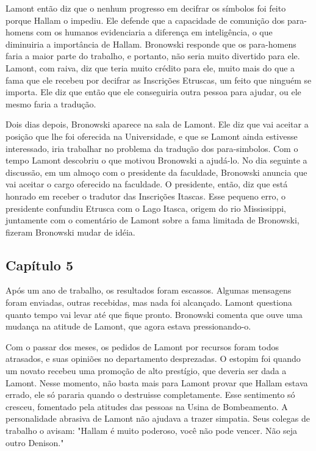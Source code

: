 \documentclass[14pt,portuguese]{extreport}
\begin{document}
        Lamont então diz que o nenhum progresso em decifrar os símbolos foi feito porque Hallam o impediu. Ele defende que a capacidade de comunição dos para-homens com os humanos evidenciaria a diferença em inteligência, o que diminuiria a importância de Hallam. Bronowski responde que os para-homens faria a maior parte do trabalho, e portanto, não seria muito divertido para ele. Lamont, com raiva, diz que teria muito crédito para ele, muito mais do que a fama que ele recebeu por decifrar as Inscrições Etruscas, um feito que ninguém se importa. Ele diz que então que ele conseguiria outra pessoa para ajudar, ou ele mesmo faria a tradução.
	
    	  Dois dias depois, Bronowski aparece na sala de Lamont. Ele diz que vai aceitar a posição que lhe foi oferecida na Universidade, e que se Lamont ainda estivesse interessado, iria trabalhar no problema da tradução dos para-simbolos. Com o tempo Lamont descobriu o que motivou Bronowski a ajudá-lo. No dia seguinte a discussão, em um almoço com o presidente da faculdade, Bronowski anuncia que vai aceitar o cargo oferecido na faculdade. O presidente, então, diz que está honrado em receber o tradutor das Inscrições Itascas. Esse pequeno erro, o presidente confundiu Etrusca com o Lago Itasca, origem do rio Mississippi, juntamente com o comentário de Lamont sobre a fama limitada de Bronowski, fizeram Bronowski mudar de idéia.

      \subsection{Capítulo 5}

    	  Após um ano de trabalho, os resultados foram escassos. Algumas mensagens foram enviadas, 
    	  outras recebidas, mas nada foi alcançado. Lamont questiona quanto tempo vai levar 
    	  até que fique pronto. Bronowski comenta que ouve uma mudança na atitude de Lamont, que agora 
    	  estava pressionando-o.
	
    	  Com o passar dos meses, os pedidos de Lamont por recursos foram todos atrasados, e suas opiniões no departamento desprezadas. O estopim foi quando um novato recebeu uma promoção de alto prestígio, que deveria ser dada a Lamont. Nesse momento, não basta mais para Lamont provar que Hallam estava errado, ele só pararia quando o destruisse completamente. Esse sentimento só cresceu, fomentado pela atitudes das pessoas na Usina de Bombeamento. A personalidade abrasiva de Lamont não ajudava a trazer simpatia. Seus colegas de trabalho o avisam: "Hallam é muito poderoso, você não pode vencer. Não seja outro Denison."
    	  
\end{document}

